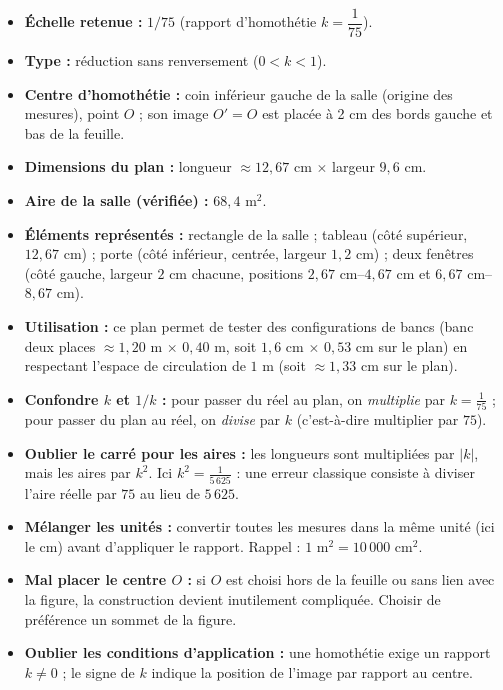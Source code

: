 \documentclass[11pt]{article}
\begin{document}
\begin{definition}
\begin{itemize}
    \item \textbf{Échelle retenue :} $1/75$ (rapport d'homothétie $k = \dfrac{1}{75}$).
    \item \textbf{Type :} réduction sans renversement ($0 < k < 1$).
    \item \textbf{Centre d'homothétie :} coin inférieur gauche de la salle (origine des mesures), point $O$ ; son image $O' = O$ est placée à 2 cm des bords gauche et bas de la feuille.
    \item \textbf{Dimensions du plan :} longueur $\approx 12,67$ cm $\times$ largeur $9,6$ cm.
    \item \textbf{Aire de la salle (vérifiée) :} $68,4 \text{ m}^2$.
    \item \textbf{Éléments représentés :} rectangle de la salle ; tableau (côté supérieur, $12,67$ cm) ; porte (côté inférieur, centrée, largeur $1,2$ cm) ; deux fenêtres (côté gauche, largeur $2$ cm chacune, positions $2,67$ cm--$4,67$ cm et $6,67$ cm--$8,67$ cm).
    \item \textbf{Utilisation :} ce plan permet de tester des configurations de bancs (banc deux places $\approx 1,20$ m $\times$ $0,40$ m, soit $1,6$ cm $\times$ $0,53$ cm sur le plan) en respectant l'espace de circulation de $1$ m (soit $\approx 1,33$ cm sur le plan).
\end{itemize}
\end{definition}

\begin{attention}
\begin{itemize}
    \item \textbf{Confondre $k$ et $1/k$ :} pour passer du réel au plan, on \emph{multiplie} par $k = \frac{1}{75}$ ; pour passer du plan au réel, on \emph{divise} par $k$ (c'est-à-dire multiplier par $75$).
    \item \textbf{Oublier le carré pour les aires :} les longueurs sont multipliées par $|k|$, mais les aires par $k^2$. Ici $k^2 = \frac{1}{5\,625}$ : une erreur classique consiste à diviser l'aire réelle par $75$ au lieu de $5\,625$.
    \item \textbf{Mélanger les unités :} convertir toutes les mesures dans la même unité (ici le cm) avant d'appliquer le rapport. Rappel : $1 \text{ m}^2 = 10\,000 \text{ cm}^2$.
    \item \textbf{Mal placer le centre $O$ :} si $O$ est choisi hors de la feuille ou sans lien avec la figure, la construction devient inutilement compliquée. Choisir de préférence un sommet de la figure.
    \item \textbf{Oublier les conditions d'application :} une homothétie exige un rapport $k \neq 0$ ; le signe de $k$ indique la position de l'image par rapport au centre.
\end{itemize}
\end{attention}
\end{document}
